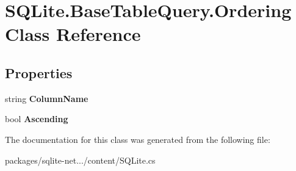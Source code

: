 \hypertarget{classSQLite_1_1BaseTableQuery_1_1Ordering}{}\section{S\+Q\+Lite.\+Base\+Table\+Query.\+Ordering Class Reference}
\label{classSQLite_1_1BaseTableQuery_1_1Ordering}
\subsection*{Properties}
\begin{DoxyCompactItemize}
\item 
\hypertarget{classSQLite_1_1BaseTableQuery_1_1Ordering_a4a73e6f27bb0b7b71672c2440f1e26d8}{}string {\bfseries Column\+Name}\label{classSQLite_1_1BaseTableQuery_1_1Ordering_a4a73e6f27bb0b7b71672c2440f1e26d8}

\item 
\hypertarget{classSQLite_1_1BaseTableQuery_1_1Ordering_a6ac459a921405f8a577c64f70e615359}{}bool {\bfseries Ascending}\label{classSQLite_1_1BaseTableQuery_1_1Ordering_a6ac459a921405f8a577c64f70e615359}

\end{DoxyCompactItemize}


The documentation for this class was generated from the following file\+:\begin{DoxyCompactItemize}
\item 
packages/sqlite-\/net.../content/S\+Q\+Lite.\+cs\end{DoxyCompactItemize}
